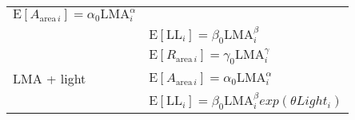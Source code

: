\documentclass[
  12pt,
]{article}
\providecommand{\DIFaddbegin}{} %
\providecommand{\DIFaddend}{} %
\providecommand{\DIFdelbegin}{} %
\providecommand{\DIFdelend}{} %
\newcommand{\DIFscaledelfig}{0.5}
\newlength{\DIFdelgraphicswidth} %
\newlength{\DIFdelgraphicsheight} %
\newcommand{\DIFaddincludegraphics}[2][]{{\color{blue}\fbox{\DIFOincludegraphics[#1]{#2}}}} %
\newcommand{\DIFdelincludegraphics}[2][]{%
\sbox{\DIFdelgraphicsbox}{\DIFOincludegraphics[#1]{#2}}%
\settoboxwidth{\DIFdelgraphicswidth}{\DIFdelgraphicsbox} %
\settoboxtotalheight{\DIFdelgraphicsheight}{\DIFdelgraphicsbox} %
\scalebox{\DIFscaledelfig}{%
\parbox[b]{\DIFdelgraphicswidth}{\usebox{\DIFdelgraphicsbox}\\[-\baselineskip] \rule{\DIFdelgraphicswidth}{0em}}\llap{\resizebox{\DIFdelgraphicswidth}{\DIFdelgraphicsheight}{%
\setlength{\unitlength}{\DIFdelgraphicswidth}%
\begin{picture}(1,1)%
\thicklines\linethickness{2pt} %
{\color[rgb]{1,0,0}\put(0,0){\framebox(1,1){}}}%
{\color[rgb]{1,0,0}\put(0,0){\line( 1,1){1}}}%
{\color[rgb]{1,0,0}\put(0,1){\line(1,-1){1}}}%
\end{picture}%
}\hspace*{3pt}}} %
} %
\DeclareRobustCommand{\DIFaddbegin}{\DIFOaddbegin \let\includegraphics\DIFaddincludegraphics} %
\DeclareRobustCommand{\DIFaddend}{\DIFOaddend \let\includegraphics\DIFOincludegraphics} %
\DeclareRobustCommand{\DIFdelbegin}{\DIFOdelbegin \let\includegraphics\DIFdelincludegraphics} %
\DeclareRobustCommand{\DIFdelend}{\DIFOaddend \let\includegraphics\DIFOincludegraphics} %
\begin{document}
\begin{longtable}[]{@{}
  >{\raggedright\arraybackslash}p{}
  >{\raggedright\arraybackslash}p{}@{}}
\DIFdelend \(\mathrm{E}[A_{\mathrm{area} \, i}] = \alpha_0\mathrm{LMA}_{i}^{\alpha}\) \DIFdelbegin %
\DIFdelend \DIFaddbegin \\
\DIFaddend & \DIFdelbegin %
\DIFdelend \(\mathrm{E}[\mathrm{LL}_i] = \beta_0\mathrm{LMA}_{i}^{\beta}\) \DIFdelbegin %
\DIFdelend \DIFaddbegin \\
\DIFaddend & \DIFdelbegin %
\DIFdelend \(\mathrm{E}[R_{\mathrm{area} \, i}] = \gamma_0\mathrm{LMA}_{i}^{\gamma}\) \DIFdelbegin %
\DIFdelend \DIFaddbegin \\
\DIFaddend LMA + light \DIFdelbegin %
\DIFdelend & \DIFdelbegin %
\DIFdelend \(\mathrm{E}[A_{\mathrm{area} \, i}] = \alpha_0\mathrm{LMA}_{i}^{\alpha}\) \DIFdelbegin %
\DIFdelend \DIFaddbegin \\
\DIFaddend & \DIFdelbegin %
\DIFdelend \(\mathrm{E}[\mathrm{LL}_i] = \beta_0\mathrm{LMA}_{i}^{\beta}exp(\theta Light_i)\) \DIFdelbegin %

\end{longtable}
\end{document}
